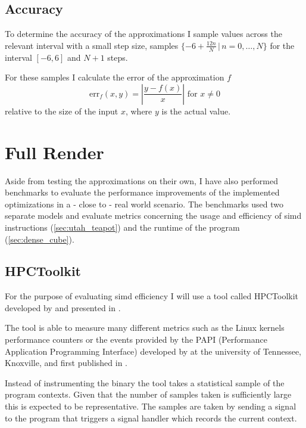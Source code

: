 \documentclass[a4paper, 11pt]{memoir}
\begin{document}
    \subsection{Accuracy}
    \label{sec:expr_accuracy}
    To determine the accuracy of the approximations I sample values across the relevant interval with a small step size,
    \eg samples $\{ -6 + \frac{12n}{N}\,|\, n=0,\dots,N \}$ for the interval $[-6, 6]$ and $N+1$ steps.

    For these samples I calculate the error of the approximation $f$
    \begin{equation}
        \text{err}_f(x, y) = \left|\frac{y - f(x)}{x}\right| \text{ for } x\ne0
    \end{equation}
    relative to the size of the input $x$, where $y$ is the actual value.

    \section{Full Render}
    \label{sec:expr_full_render}
    Aside from testing the approximations on their own, I have also performed benchmarks to evaluate the performance
    improvements of the implemented optimizations in a - close to - real world scenario. The benchmarks used two separate
    models and evaluate metrics concerning the usage and efficiency of \gls{simd} instructions (\ref{sec:utah_teapot})
    and the runtime of the program (\ref{sec:dense_cube}).

    \subsection{HPCToolkit}
    \label{sec:hpctoolkit}
    For the purpose of evaluating \gls{simd} efficiency I will use a tool called HPCToolkit developed by
    \citeauthor{hpc_toolkit} and presented in  \cite{hpc_toolkit}.

    The tool is able to measure many different metrics such as the Linux kernels performance counters or the events
    provided by the PAPI (Performance Application Programming Interface) developed by \citeauthor{papi} at the university
    of Tennessee, Knoxville, and first published in  \cite{papi}.

    Instead of instrumenting the binary the tool takes a statistical sample of the program contexts. Given that the number
    of samples taken is sufficiently large this is expected to be representative. The samples are taken by sending a signal
    to the program that triggers a signal handler which records the current context.
\end{document}
